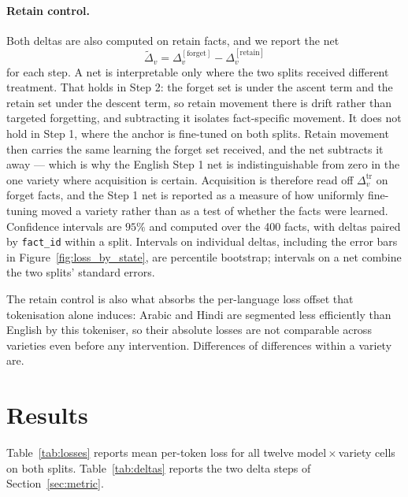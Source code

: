 \documentclass[11pt]{article}
\begin{document}
\paragraph{Retain control.}
Both deltas are also computed on retain facts, and we report the net
\[
  \widetilde{\Delta}_v = \Delta_v^{[\text{forget}]} - \Delta_v^{[\text{retain}]}
\]
for each step. A net is interpretable only where the two splits received
different treatment. That holds in Step 2: the forget set is under the ascent
term and the retain set under the descent term, so retain movement there is
drift rather than targeted forgetting, and subtracting it isolates
fact-specific movement. It does not hold in Step 1, where the anchor is
fine-tuned on both splits. Retain movement then carries the same learning the
forget set received, and the net subtracts it away — which is why the English
Step 1 net is indistinguishable from zero in the one variety where
acquisition is certain. Acquisition is therefore read off
$\Delta_v^{\text{tr}}$ on forget facts, and the Step 1 net is reported as a
measure of how uniformly fine-tuning moved a variety rather than as a test of
whether the facts were learned. Confidence intervals are $95\%$ and computed over the 400 facts, with
deltas paired by \texttt{fact\_id} within a split. Intervals on individual
deltas, including the error bars in Figure~\ref{fig:loss_by_state}, are
percentile bootstrap; intervals on a net combine the two splits' standard
errors.

The retain control is also what absorbs the per-language loss offset that
tokenisation alone induces: Arabic and Hindi are segmented less efficiently
than English by this tokeniser, so their absolute losses are not comparable
across varieties even before any intervention. Differences of differences
within a variety are.

\section{Results}
\label{sec:results}

Table~\ref{tab:losses} reports mean per-token loss for all twelve
model\,$\times$\,variety cells on both splits.
Table~\ref{tab:deltas} reports the two delta steps of
Section~\ref{sec:metric}.
\end{document}
